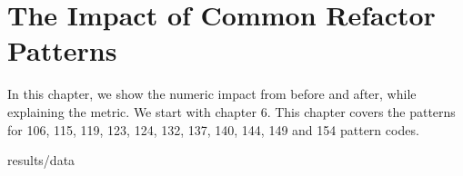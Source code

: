 \section{The Impact of Common Refactor Patterns}

In this chapter, we show the numeric impact from before and after, while explaining the metric. We start with chapter 6.
This chapter covers the patterns for 106, 115, 119, 123, 124, 132, 137, 140, 144, 149 and 154 pattern codes.

{results/data}
